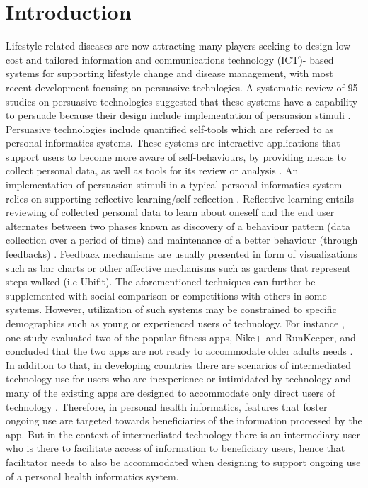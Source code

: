 \documentclass{sig-alternate}
\begin{document}
\section{Introduction} 
Lifestyle-related diseases are now attracting many players seeking to design low cost and tailored information and communications technology (ICT)- based systems for supporting lifestyle change and disease management\cite{arsand:mobile}, with most recent development focusing on persuasive technlogies. A systematic review of 95 studies on persuasive technologies suggested that these systems have a capability to persuade because their design include implementation of persuasion stimuli \cite{hamari2014persuasive}.\newline
Persuasive technologies include quantified self-tools which are referred to as personal informatics systems. These systems are interactive applications that support users to become more aware of self-behaviours, by providing means to collect personal data, as well as tools for its review or analysis \cite{li2011:personal,li2012:personal}. An implementation of persuasion stimuli in a typical personal informatics system relies on supporting reflective learning/self-reflection \cite{li2011:understanding}. Reflective learning entails reviewing of collected personal data to learn about oneself and the end user alternates between two phases known as discovery of a behaviour pattern (data collection over a period of time) and maintenance of a better behaviour (through feedbacks) \cite{li2011:understanding}. Feedback mechanisms are usually presented in form of visualizations such as bar charts or other affective mechanisms such as gardens that represent steps walked (i.e Ubifit\cite{klasnja2009:using}). The aforementioned techniques can further be supplemented with social comparison\cite{Oinas-kukkonen:psd} or competitions with others\cite{comber2013:designing} in some systems.\newline
However, utilization of such systems may be constrained to specific demographics such as young or experienced users of technology. For instance , one study evaluated two of the popular fitness apps, Nike+ and RunKeeper, and concluded that the two apps are not ready to accommodate older adults needs \cite{silva2014:smartphones}. In addition to that, in developing countries there are scenarios of intermediated technology use for users who are inexperience or intimidated by technology and many of the existing apps are designed to accommodate only direct users of technology \cite{sambasivan2010}. Therefore, in personal health informatics, features that foster ongoing use are targeted towards beneficiaries of the information processed by the app. But in the context of intermediated technology there is an intermediary user who is there to facilitate access of information to beneficiary users, hence that facilitator needs to also be accommodated when designing to support ongoing use of a personal health informatics system.\newline
\end{document}
